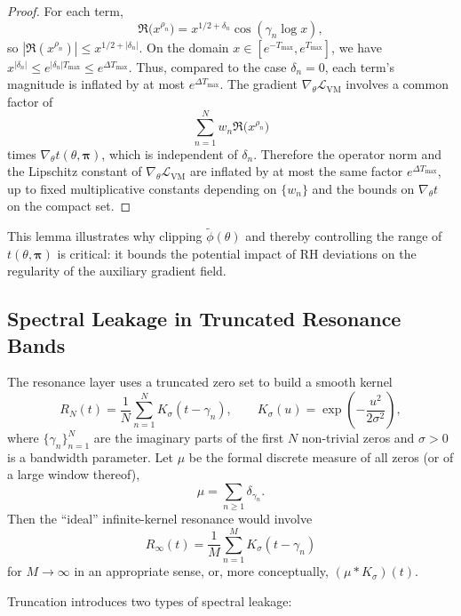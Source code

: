 \documentclass[11pt]{article}
\begin{document}
\begin{proof}
For each term,
\[
  \Re\!\big(x^{\rho_n}\big) = x^{1/2 + \delta_n} \cos(\gamma_n\log x),
\]
so $|\Re(x^{\rho_n})| \le x^{1/2 + |\delta_n|}$. On the domain $x\in[e^{-T_{\max}}, e^{T_{\max}}]$, we have $x^{|\delta_n|} \le e^{|\delta_n| T_{\max}} \le e^{\Delta T_{\max}}$. Thus, compared to the case $\delta_n=0$, each term’s magnitude is inflated by at most $e^{\Delta T_{\max}}$. The gradient $\nabla_\theta \mathcal{L}_{\mathrm{VM}}$ involves a common factor of
\[
  \sum_{n=1}^N w_n \Re\!\big(x^{\rho_n}\big)
\]
times $\nabla_\theta t(\theta,\bm{\pi})$, which is independent of $\delta_n$. Therefore the operator norm and the Lipschitz constant of $\nabla_\theta \mathcal{L}_{\mathrm{VM}}$ are inflated by at most the same factor $e^{\Delta T_{\max}}$, up to fixed multiplicative constants depending on $\{w_n\}$ and the bounds on $\nabla_\theta t$ on the compact set.
\end{proof}

This lemma illustrates why clipping $\tilde{\phi}(\theta)$ and thereby controlling the range of $t(\theta,\bm{\pi})$ is critical: it bounds the potential impact of RH deviations on the regularity of the auxiliary gradient field.

\subsection{Spectral Leakage in Truncated Resonance Bands}

The resonance layer uses a truncated zero set to build a smooth kernel
\[
  R_N(t) = \frac{1}{N}\sum_{n=1}^N K_\sigma(t - \gamma_n),
  \qquad K_\sigma(u) = \exp\!\left(-\frac{u^2}{2\sigma^2}\right),
\]
where $\{\gamma_n\}_{n=1}^N$ are the imaginary parts of the first $N$ non-trivial zeros and $\sigma>0$ is a bandwidth parameter. Let $\mu$ be the formal discrete measure of all zeros (or of a large window thereof),
\[
  \mu = \sum_{n\ge 1} \delta_{\gamma_n}.
\]
Then the ``ideal'' infinite-kernel resonance would involve
\[
  R_\infty(t) = \frac{1}{M}\sum_{n=1}^M K_\sigma(t-\gamma_n)
\]
for $M\to\infty$ in an appropriate sense, or, more conceptually, $(\mu * K_\sigma)(t)$.

Truncation introduces two types of spectral leakage:
\end{document}
